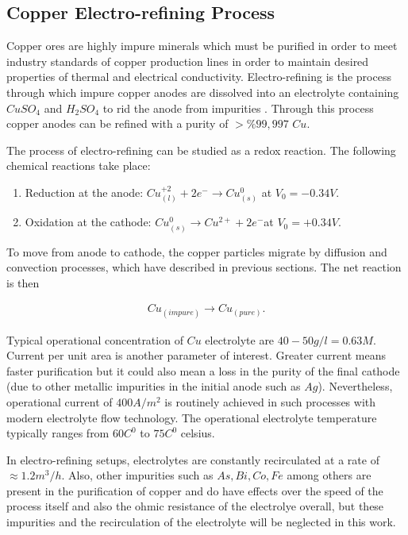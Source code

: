 \subsection{Copper Electro-refining Process}

Copper ores are highly impure minerals which must be purified in order to meet industry standards of copper production lines in order to maintain desired properties of thermal and electrical conductivity. Electro-refining is the process through which impure copper anodes are dissolved into an electrolyte containing $CuSO_4$ and $H_2SO_4$ to rid the anode from impurities \cite{schlesinger}. Through this process copper anodes can be refined with a purity of $>\%99,997$ $Cu$.


The process of electro-refining can be studied as a redox reaction. The following chemical reactions take place:
\begin{enumerate}
	\item Reduction at the anode: $Cu^{+2}_{(l)} + 2e^- \rightarrow Cu^{0}_{(s)} $  at $V_0 = -0.34V$.
	\item Oxidation at the cathode: $Cu^0_{(s)} \rightarrow Cu^{2+} + 2e^-$at $V_0 = +0.34V$.
\end{enumerate}

To move from anode to cathode, the copper particles migrate by diffusion and convection processes, which have described in previous sections. The net reaction is then

\begin{align}
	Cu_{(impure)} \rightarrow Cu_{(pure)}.
\end{align}

Typical operational concentration of $Cu$ electrolyte are $40-50 g/l = 0.63 M$\cite{schlesinger}. Current per unit area is another parameter of interest. Greater current means faster purification but it could also mean a loss in the purity of the final cathode (due to other metallic impurities in the initial anode such as $Ag$). Nevertheless, operational current of $400 A/m^2$ is routinely achieved in such processes with modern electrolyte flow technology. The operational electrolyte temperature typically ranges from $60 C^0$ to $75 C^0$ celsius.

In electro-refining setups, electrolytes are constantly recirculated at a rate of $\approx 1.2 m^3/h$. Also, other impurities such as $As, Bi, Co, Fe$ among others are present in the purification of copper and do have effects over the speed of the process itself and also the ohmic resistance of the electrolye overall, but these impurities and the recirculation of the electrolyte will be neglected in this work. 


